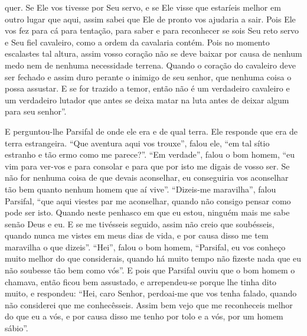 quer. Se Ele vos tivesse por Seu servo, e se Ele visse que estaríeis melhor em
outro lugar que aqui, assim sabei que Ele de pronto vos ajudaria a sair. Pois
Ele vos fez para cá para tentação, para saber e para reconhecer se sois Seu
reto servo e Seu fiel cavaleiro, como a ordem da cavalaria contém. Pois no
momento escalastes tal altura, assim vosso coração não se deve baixar por causa
de nenhum medo nem de nenhuma necessidade terrena. Quando o coração do
cavaleiro deve ser fechado e assim duro perante o inimigo de seu senhor, que
nenhuma coisa o possa assustar. E se for trazido a temor, então não é um
verdadeiro cavaleiro e um verdadeiro lutador que antes se deixa matar na luta
antes de deixar algum para seu senhor”.  

E perguntou-lhe Parsifal de onde ele era e de qual terra. Ele responde que
era de terra estrangeira. “Que aventura aqui vos trouxe”, falou ele, “em tal
sítio estranho e tão ermo como me parece?”. “Em verdade”, falou o bom homem,
“eu vim para ver-vos e para consolar e para que por isto me digais de vosso
ser. Se não for nenhuma coisa de que devais aconselhar, eu conseguiria vos
aconselhar tão bem quanto nenhum homem que aí vive”. “Dizeis-me maravilha”,
falou Parsifal, “que aqui viestes par me aconselhar, quando não consigo pensar
como pode ser isto. Quando neste penhasco em que eu estou,
ninguém mais me sabe senão Deus e eu. E se me tivésseis seguido, assim não
creio que soubésseis, quando nunca me vistes em meus dias de vida, e por causa
disso me tem maravilha o que dizeis”. “Hei”, falou o bom homem, “Parsifal, eu
vos conheço muito melhor do que considerais, quando há muito tempo não fizeste
nada que eu não soubesse tão bem como vós”. E pois que Parsifal ouviu que o
bom homem o chamava, então ficou bem assustado, e arrependeu-se porque lhe
tinha dito muito, e respondeu: “Hei, caro Senhor, perdoai-me que vos tenha
falado, quando não considerei que me conhecêsseis. Assim bem vejo que me
reconheceis melhor do que eu a vós, e por causa disso me tenho por tolo e a
vós, por um homem sábio”.

